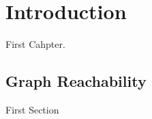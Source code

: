 \chapter{Introduction}
\label{chap:intro}

First Cahpter.

\section{Graph Reachability}
First Section

